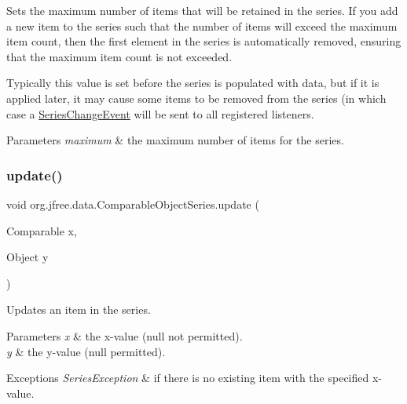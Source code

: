 Sets the maximum number of items that will be retained in the series. If you add a new item to the series such that the number of items will exceed the maximum item count, then the first element in the series is automatically removed, ensuring that the maximum item count is not exceeded. 

Typically this value is set before the series is populated with data, but if it is applied later, it may cause some items to be removed from the series (in which case a \mbox{\hyperlink{}{Series\+Change\+Event}} will be sent to all registered listeners.


\begin{DoxyParams}{Parameters}
{\em maximum} & the maximum number of items for the series. \\
\hline
\end{DoxyParams}
\mbox{\label{classorg_1_1jfree_1_1data_1_1_comparable_object_series_a63b31a6d9f4b27a310d5bc529c02c969}} 
\subsubsection{\texorpdfstring{update()}{update()}}
{\footnotesize\ttfamily void org.\+jfree.\+data.\+Comparable\+Object\+Series.\+update (\begin{DoxyParamCaption}\item[{Comparable}]{x,  }\item[{Object}]{y }\end{DoxyParamCaption})\hspace{0.3cm}{\ttfamily [protected]}}

Updates an item in the series.


\begin{DoxyParams}{Parameters}
{\em x} & the x-\/value ({\ttfamily null} not permitted). \\
\hline
{\em y} & the y-\/value ({\ttfamily null} permitted).\\
\hline
\end{DoxyParams}

\begin{DoxyExceptions}{Exceptions}
{\em Series\+Exception} & if there is no existing item with the specified x-\/value. \\
\hline
\end{DoxyExceptions}
\mbox{\label{classorg_1_1jfree_1_1data_1_1_comparable_object_series_acf27539e8d6e3d295a82e67544cc4bb1}} 
